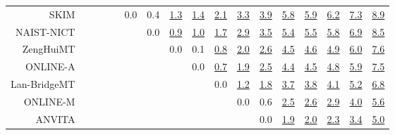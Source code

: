\documentclass[11pt]{article}
\begin{document}
\begin{sidewaystable}
\begin{center}
{\begin{tabular}{rcccccccccccccccc}
SKIM &  &  &  &  & \cellcolor{red!0} 0.0 & \cellcolor{red!70} 0.4 & \cellcolor{red!70} \underline{1.3} & \cellcolor{red!70} \underline{1.4} & \cellcolor{red!70} \underline{2.1} & \cellcolor{red!70} \underline{3.3} & \cellcolor{red!70} \underline{3.9} & \cellcolor{red!70} \underline{5.8} & \cellcolor{red!70} \underline{5.9} & \cellcolor{red!70} \underline{6.2} & \cellcolor{red!70} \underline{7.3} & \cellcolor{red!70} \underline{8.9}\\ 
NAIST-NICT &  &  &  &  &  & \cellcolor{red!0} 0.0 & \cellcolor{red!70} \underline{0.9} & \cellcolor{red!70} \underline{1.0} & \cellcolor{red!70} \underline{1.7} & \cellcolor{red!70} \underline{2.9} & \cellcolor{red!70} \underline{3.5} & \cellcolor{red!70} \underline{5.4} & \cellcolor{red!70} \underline{5.5} & \cellcolor{red!70} \underline{5.8} & \cellcolor{red!70} \underline{6.9} & \cellcolor{red!70} \underline{8.5}\\ 
ZengHuiMT &  &  &  &  &  &  & \cellcolor{red!0} 0.0 & \cellcolor{red!0} 0.1 & \cellcolor{red!70} \underline{0.8} & \cellcolor{red!70} \underline{2.0} & \cellcolor{red!70} \underline{2.6} & \cellcolor{red!70} \underline{4.5} & \cellcolor{red!70} \underline{4.6} & \cellcolor{red!70} \underline{4.9} & \cellcolor{red!70} \underline{6.0} & \cellcolor{red!70} \underline{7.6}\\ 
ONLINE-A &  &  &  &  &  &  &  & \cellcolor{red!0} 0.0 & \cellcolor{red!70} \underline{0.7} & \cellcolor{red!70} \underline{1.9} & \cellcolor{red!70} \underline{2.5} & \cellcolor{red!70} \underline{4.4} & \cellcolor{red!70} \underline{4.5} & \cellcolor{red!70} \underline{4.8} & \cellcolor{red!70} \underline{5.9} & \cellcolor{red!70} \underline{7.5}\\ 
Lan-BridgeMT &  &  &  &  &  &  &  &  & \cellcolor{red!0} 0.0 & \cellcolor{red!70} \underline{1.2} & \cellcolor{red!70} \underline{1.8} & \cellcolor{red!70} \underline{3.7} & \cellcolor{red!70} \underline{3.8} & \cellcolor{red!70} \underline{4.1} & \cellcolor{red!70} \underline{5.2} & \cellcolor{red!70} \underline{6.8}\\ 
ONLINE-M &  &  &  &  &  &  &  &  &  & \cellcolor{red!0} 0.0 & \cellcolor{red!70} 0.6 & \cellcolor{red!70} \underline{2.5} & \cellcolor{red!70} \underline{2.6} & \cellcolor{red!70} \underline{2.9} & \cellcolor{red!70} \underline{4.0} & \cellcolor{red!70} \underline{5.6}\\ 
ANVITA &  &  &  &  &  &  &  &  &  &  & \cellcolor{red!0} 0.0 & \cellcolor{red!70} \underline{1.9} & \cellcolor{red!70} \underline{2.0} & \cellcolor{red!70} \underline{2.3} & \cellcolor{red!70} \underline{3.4} & \cellcolor{red!70} \underline{5.0}\\ 

\end{tabular}}
\end{center}
\end{sidewaystable}
\end{document}
